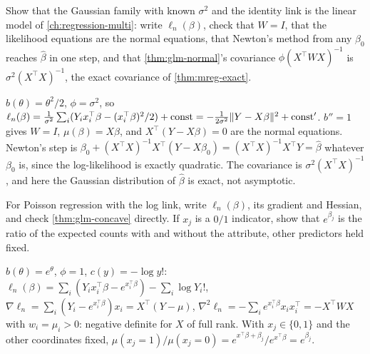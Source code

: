 \begin{exercise}
\label{ex:glm-gaussian}
Show that the Gaussian family with known $\sigma^2$ and the identity link is the linear model of \cref{ch:regression-multi}: write $\ell_n(\beta)$, check that $W = I$, that the likelihood equations are the normal equations, that Newton's method from any $\beta_0$ reaches $\hat{\beta}$ in one step, and that \cref{thm:glm-normal}'s covariance $\phi(X^\top\hat{W}X)^{-1}$ is $\sigma^2(X^\top X)^{-1}$, the exact covariance of \cref{thm:mreg-exact}.
\end{exercise}
\begin{solution}
$b(\theta) = \theta^2/2$, $\phi = \sigma^2$, so $\ell_n(\beta) = \frac{1}{\sigma^2}\sum_i(Y_ix_i^\top\beta - (x_i^\top\beta)^2/2) + \text{const} = -\frac{1}{2\sigma^2}\lVert Y - X\beta\rVert^2 + \text{const}'$. $b'' = 1$ gives $W = I$, $\mu(\beta) = X\beta$, and $X^\top(Y - X\beta) = 0$ are the normal equations. Newton's step is $\beta_0 + (X^\top X)^{-1}X^\top(Y - X\beta_0) = (X^\top X)^{-1}X^\top Y = \hat{\beta}$ whatever $\beta_0$ is, since the log-likelihood is exactly quadratic. The covariance is $\sigma^2(X^\top X)^{-1}$, and here the Gaussian distribution of $\hat{\beta}$ is exact, not asymptotic.
\end{solution}

\begin{exercise}
\label{ex:glm-poisson-grad}
For Poisson regression with the log link, write $\ell_n(\beta)$, its gradient and Hessian, and check \cref{thm:glm-concave} directly. If $x_j$ is a $0/1$ indicator, show that $e^{\beta_j}$ is the ratio of the expected counts with and without the attribute, other predictors held fixed.
\end{exercise}
\begin{solution}
$b(\theta) = e^\theta$, $\phi = 1$, $c(y) = -\log y!$: $\ell_n(\beta) = \sum_i(Y_ix_i^\top\beta - e^{x_i^\top\beta}) - \sum_i\log Y_i!$, $\nabla\ell_n = \sum_i(Y_i - e^{x_i^\top\beta})x_i = X^\top(Y - \mu)$, $\nabla^2\ell_n = -\sum_i e^{x_i^\top\beta}x_ix_i^\top = -X^\top WX$ with $w_i = \mu_i > 0$: negative definite for $X$ of full rank. With $x_j \in \{0, 1\}$ and the other coordinates fixed, $\mu(x_j = 1)/\mu(x_j = 0) = e^{x^\top\beta + \beta_j}/e^{x^\top\beta} = e^{\beta_j}$.
\end{solution}

